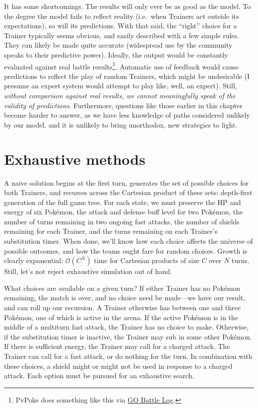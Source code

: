It has some shortcomings.
The results will only ever be as good as the model.
To the degree the model fails to reflect reality (i.e.\ when Trainers act outside
 its expectations), so will its predictions.
With that said, the ``right'' choice for a Trainer typically seems obvious,
 and easily described with a few simple rules.
They can likely be made quite accurate (widespread use by the community speaks to their predictive power).
Ideally, the output would be constantly evaluated against real battle results\footnote{PvPoke does something like this via \href{https://gobattlelog.com}{GO Battle Log}.}.
Automatic use of feedback would cause predictions to reflect the play of random Trainers,
 which might be undesirable (I presume an expert system would attempt to play like, well, an expert).
Still, \textit{without comparison against real results, we cannot meaningfully speak of the validity of predictions}.
Furthermore, questions like those earlier in this chapter become harder to answer,
 as we have less knowledge of paths considered unlikely by our model,
 and it is unlikely to bring unorthodox, new strategies to light.

\section{Exhaustive methods\label{sec:exhaustive}}
A naive solution begins at the first turn, generates the set of possible
  choices for both Trainers, and recurses across the Cartesian product
  of these sets: depth-first generation of the full game tree.
For each state, we must preserve the HP and energy of six Pokémon,
  the attack and defense buff level for two Pokémon,
  the number of turns remaining in two ongoing fast attacks,
  the number of shields remaining for each Trainer,
  and the turns remaining on each Trainer's substitution timer.
When done, we'll know how each choice affects the universe of possible outcomes,
  and how the teams ought fare for random choices.
Growth is clearly exponential: $\mathcal{O}(C^N)$ time for Cartesian products of size $C$ over $N$ turns.
Still, let's not reject exhaustive simulation out of hand.

What choices are available on a given turn?
If either Trainer has no Pokémon remaining, the match is over, and no choice
  need be made---we have our result, and can roll up our recursion.
A Trainer otherwise has between one and three Pokémon, one of which is active
  in the arena.
If the active Pokémon is in the middle of a multiturn fast attack, the
  Trainer has no choice to make.
Otherwise, if the substitution timer is inactive, the Trainer may sub in some other Pokémon.
If there is sufficient energy, the Trainer may call for a charged attack.
The Trainer can call for a fast attack, or do nothing for the turn.
In combination with these choices, a shield might or might not be used in response to a charged attack.
Each option must be pursued for an exhaustive search.

